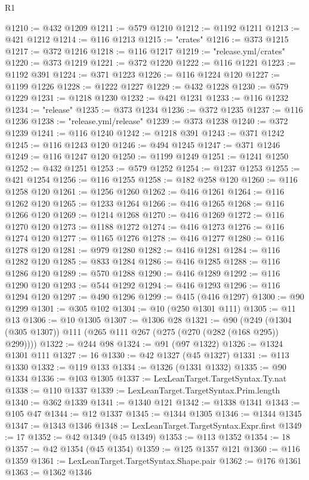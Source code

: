 \begin{lexlean}{R1}
\begin{coremodule}
@1210 := @432 @1209
@1211 := @579 @1210
@1212 := @1192 @1211
@1213 := @421 @1212
@1214 := @116 @1213
@1215 := "crates"
@1216 := @373 @1215
@1217 := @372 @1216
@1218 := @116 @1217
@1219 := "release.yml/crates"
@1220 := @373 @1219
@1221 := @372 @1220
@1222 := @116 @1221
@1223 := @1192 @391
@1224 := @371 @1223
@1226 := @116 @1224 @120
@1227 := @1199 @1226
@1228 := @1222 @1227
@1229 := @432 @1228
@1230 := @579 @1229
@1231 := @1218 @1230
@1232 := @421 @1231
@1233 := @116 @1232
@1234 := "release"
@1235 := @373 @1234
@1236 := @372 @1235
@1237 := @116 @1236
@1238 := "release.yml/release"
@1239 := @373 @1238
@1240 := @372 @1239
@1241 := @116 @1240
@1242 := @1218 @391
@1243 := @371 @1242
@1245 := @116 @1243 @120
@1246 := @494 @1245
@1247 := @371 @1246
@1249 := @116 @1247 @120
@1250 := @1199 @1249
@1251 := @1241 @1250
@1252 := @432 @1251
@1253 := @579 @1252
@1254 := @1237 @1253
@1255 := @421 @1254
@1256 := @116 @1255
@1258 := @182 @258 @120
@1260 := @116 @1258 @120
@1261 := @1256 @1260
@1262 := @416 @1261
@1264 := @116 @1262 @120
@1265 := @1233 @1264
@1266 := @416 @1265
@1268 := @116 @1266 @120
@1269 := @1214 @1268
@1270 := @416 @1269
@1272 := @116 @1270 @120
@1273 := @1188 @1272
@1274 := @416 @1273
@1276 := @116 @1274 @120
@1277 := @1165 @1276
@1278 := @416 @1277
@1280 := @116 @1278 @120
@1281 := @979 @1280
@1282 := @416 @1281
@1284 := @116 @1282 @120
@1285 := @833 @1284
@1286 := @416 @1285
@1288 := @116 @1286 @120
@1289 := @570 @1288
@1290 := @416 @1289
@1292 := @116 @1290 @120
@1293 := @544 @1292
@1294 := @416 @1293
@1296 := @116 @1294 @120
@1297 := @490 @1296
@1299 := @415 (@416 @1297)
@1300 := @90 @1299
@1301 := @305 @102
@1304 := @10 (@250 @1301 @111)
@1305 := @11 @13
@1306 := @10 @1305
@1307 := @1306 @28
@1321 := @90 (@249 (@1304 (@305 @1307)) @111 (@265 @111 @267 (@275 (@270 (@282 (@168 @295)) @299))))
@1322 := @244 @98
@1324 := @91 (@97 @1322)
@1326 := @1324 @1301 @111
@1327 := 16
@1330 := @42 @1327 (@45 @1327)
@1331 := @113 @1330
@1332 := @119 @133
@1334 := @1326 (@1331 @1332)
@1335 := @90 @1334
@1336 := @103 @1305
@1337 := LexLeanTarget.TargetSyntax.Ty.nat
@1338 := @110 @1337
@1339 := LexLeanTarget.TargetSyntax.Prim.length
@1340 := @362 @1339
@1341 := @1340 @121
@1342 := @1338 @1341
@1343 := @105 @47
@1344 := @12 @1337
@1345 := @1344 @1305
@1346 := @1344 @1345
@1347 := @1343 @1346
@1348 := LexLeanTarget.TargetSyntax.Expr.first
@1349 := 17
@1352 := @42 @1349 (@45 @1349)
@1353 := @113 @1352
@1354 := 18
@1357 := @42 @1354 (@45 @1354)
@1359 := @125 @1357 @121
@1360 := @116 @1359
@1361 := LexLeanTarget.TargetSyntax.Shape.pair
@1362 := @176 @1361
@1363 := @1362 @1346

\end{coremodule}
\end{lexlean}

